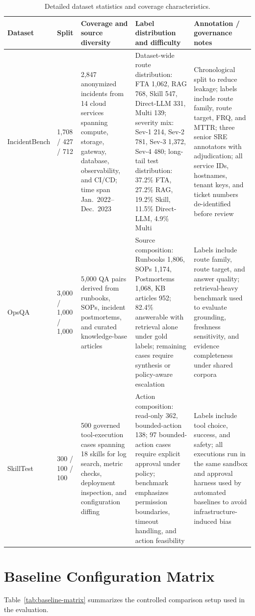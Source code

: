 \documentclass[conference]{IEEEtran}
\begin{document}
\begin{table}[t]
\centering
\caption{Detailed dataset statistics and coverage characteristics.}
\label{tab:dataset-detail}
\scriptsize
\begin{tabular}{p{1.7cm}p{1.6cm}p{3.1cm}p{4.5cm}p{5.0cm}}
\toprule
Dataset & Split & Coverage and source diversity & Label distribution and difficulty & Annotation / governance notes \\
\midrule
IncidentBench & 1{,}708 / 427 / 712 & 2{,}847 anonymized incidents from 14 cloud services spanning compute, storage, gateway, database, observability, and CI/CD; time span Jan.~2022--Dec.~2023 & Dataset-wide route distribution: FTA 1{,}062, RAG 768, Skill 547, Direct-LLM 331, Multi 139; severity mix: Sev-1 214, Sev-2 781, Sev-3 1{,}372, Sev-4 480; long-tail test distribution: 37.2\% FTA, 27.2\% RAG, 19.2\% Skill, 11.5\% Direct-LLM, 4.9\% Multi & Chronological split to reduce leakage; labels include route family, route target, FRQ, and MTTR; three senior SRE annotators with adjudication; all service IDs, hostnames, tenant keys, and ticket numbers de-identified before review \\
OpsQA & 3{,}000 / 1{,}000 / 1{,}000 & 5{,}000 QA pairs derived from runbooks, SOPs, incident postmortems, and curated knowledge-base articles & Source composition: Runbooks 1{,}806, SOPs 1{,}174, Postmortems 1{,}068, KB articles 952; 82.4\% answerable with retrieval alone under gold labels; remaining cases require synthesis or policy-aware escalation & Labels include route family, route target, and answer quality; retrieval-heavy benchmark used to evaluate grounding, freshness sensitivity, and evidence completeness under shared corpora \\
SkillTest & 300 / 100 / 100 & 500 governed tool-execution cases spanning 18 skills for log search, metric checks, deployment inspection, and configuration diffing & Action composition: read-only 362, bounded-action 138; 97 bounded-action cases require explicit approval under policy; benchmark emphasizes permission boundaries, timeout handling, and action feasibility & Labels include tool choice, success, and safety; all executions run in the same sandbox and approval harness used by automated baselines to avoid infrastructure-induced bias \\
\bottomrule
\end{tabular}
\end{table}

\section{Baseline Configuration Matrix}
\label{app:baseline-matrix}
Table~\ref{tab:baseline-matrix} summarizes the controlled comparison setup used in the evaluation.
\end{document}
